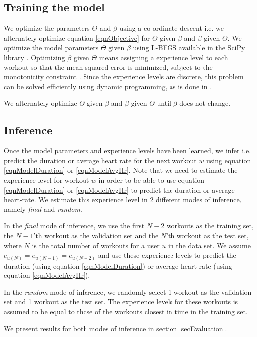 \documentclass{acm_proc_article-sp}
\begin{document}
\subsection{Training the model}
We optimize the parameters $\Theta$ and $\beta$ using a co-ordinate descent \cite{coordinateDescentWiki} i.e. we alternately optimize equation \ref{eqnObjective} for $\Theta$ given $\beta$ and $\beta$ given $\Theta$. We optimize the model parameters $\Theta$ given $\beta$ using L-BFGS \cite{lbfgs} available in the SciPy library \cite{scipy}. Optimizing $\beta$ given $\Theta$ means assigning a experience level to each workout so that the mean-squared-error is minimized, subject to the monotonicity constraint \cite{www13}. Since the experience levels are discrete, this problem can be solved efficiently using dynamic programming, as is done in \cite{www13}.

We alternately optimize $\Theta$ given $\beta$ and $\beta$ given $\Theta$ until $\beta$ does not change.

\subsection{Inference}
Once the model parameters and experience levels have been learned, we infer i.e. predict the duration or average heart rate for the next workout $w$ using equation \ref{eqnModelDuration} or \ref{eqnModelAvgHr}. Note that we need to estimate the experience level for workout $w$ in order to be able to use equation \ref{eqnModelDuration} or \ref{eqnModelAvgHr} to predict the duration or average heart-rate. We estimate this experience level in 2 different modes of inference, namely \emph{final} and \emph{random}. 

In the \emph{final} mode of inference, we use the first $N-2$ workouts as the training set, the $N-1$'th workout as the validation set and the $N$'th workout as the test set, where $N$ is the total number of workouts for a user $u$ in the data set. We assume $e_{u(N)} = e_{u(N-1)} = e_{u(N-2)}$ and use these experience levels to predict the duration (using equation \ref{eqnModelDuration}) or average heart rate (using equation \ref{eqnModelAvgHr}).

In the \emph{random} mode of inference, we randomly select 1 workout as the validation set and 1 workout as the test set. The experience levels for these workouts is assumed to be equal to those of the workouts closest in time in the training set. 

We present results for both modes of inference in section \ref{secEvaluation}.
\end{document}
